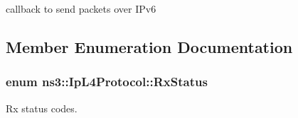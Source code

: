 callback to send packets over I\+Pv6 



\subsection{Member Enumeration Documentation}
\subsubsection[{\texorpdfstring{Rx\+Status}{RxStatus}}]{\setlength{\rightskip}{0pt plus 5cm}enum {\bf ns3\+::\+Ip\+L4\+Protocol\+::\+Rx\+Status}}\hypertarget{classns3_1_1IpL4Protocol_afd3744c89902fff232e2fd45f558c80e}{}\label{classns3_1_1IpL4Protocol_afd3744c89902fff232e2fd45f558c80e}


Rx status codes. 

